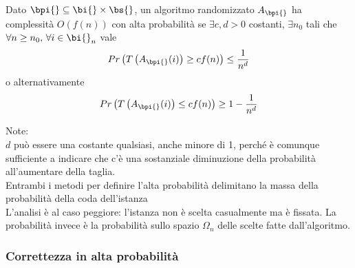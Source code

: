 \begin{definition}
    \label{def:complessita_alta_prob}
    Dato $
    \bpi{} \subseteq \bi{} \times \bs{}
    $, un algoritmo randomizzato $
    A_{\bpi{}}
    $ ha complessità $
    O \left( f(n) \right)
    $ con alta probabilità se $
    \exists c, d > 0
    $ costanti, $
    \exists n_0
    $ tali che $
    \forall n \geq n_0, 
    \,
    \forall i \in \bi{}_n
    $ vale 
    \begin{equation*}
        Pr \left( 
            T \left( 
                A_{\bpi{}}
                (i)
            \right)
            \geq c f(n)
        \right)
        \leq
        \frac{1}{n^d}
    \end{equation*}
    o alternativamente
    \begin{equation*}
        Pr \left( 
            T \left( 
                A_{\bpi{}}
                (i)
            \right)
            \leq c f(n)
        \right)
        \geq
        1-
        \frac{1}{n^d}
    \end{equation*}
\end{definition}
Note:
\\
$d$ può essere una costante qualsiasi, anche minore di 1, perché è comunque sufficiente a indicare che c'è una sostanziale diminuzione della probabilità all'aumentare della taglia.
\\
Entrambi i metodi per definire l'alta probabilità delimitano la massa della probabilità della coda dell'istanza
\\
L'analisi è al caso peggiore: l'istanza non è scelta casualmente ma è fissata.
La probabilità invece è la probabilità sullo spazio $
\Omega_n
$ delle scelte fatte dall'algoritmo.

\subsubsection{Correttezza in alta probabilità}

